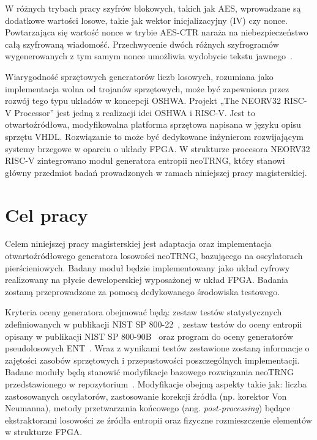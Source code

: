 W różnych trybach pracy szyfrów blokowych, takich jak AES, wprowadzane są 
dodatkowe wartości losowe, takie jak wektor inicjalizacyjny (IV) czy nonce. 
Powtarzająca się wartość nonce w trybie AES-CTR naraża na niebezpieczeństwo 
całą szyfrowaną wiadomość. Przechwycenie dwóch różnych szyfrogramów 
wygenerowanych z tym samym nonce umożliwia wydobycie tekstu jawnego~\cite{NIST-SP-800-38A}.

Wiarygodność sprzętowych generatorów liczb losowych, rozumiana jako 
implementacja wolna od trojanów sprzętowych, może być zapewniona przez rozwój 
tego typu układów w koncepcji OSHWA. Projekt „The NEORV32 RISC-V Processor” 
jest jedną z realizacji idei OSHWA i RISC-V. Jest to otwartoźródłowa, 
modyfikowalna platforma sprzętowa napisana w języku opisu sprzętu VHDL. 
Rozwiązanie to może być dedykowane inżynierom rozwijającym systemy brzegowe 
w oparciu o układy FPGA. W strukturze procesora NEORV32 RISC-V zintegrowano 
moduł generatora entropii neoTRNG, który stanowi główny przedmiot badań 
prowadzonych w ramach niniejszej pracy magisterskiej.

\section{Cel pracy}

\noindent Celem niniejszej pracy magisterskiej jest adaptacja oraz 
implementacja otwartoźródłowego generatora losowości neoTRNG, bazującego na 
oscylatorach pierścieniowych. Badany moduł będzie implementowany jako układ 
cyfrowy realizowany na płycie deweloperskiej wyposażonej w układ FPGA. Badania 
zostaną przeprowadzone za pomocą dedykowanego środowiska testowego. 

Kryteria oceny generatora obejmować będą: zestaw testów statystycznych 
zdefiniowanych w publikacji NIST SP 800-22~\cite{NIST-SP-800-22}, 
zestaw testów do oceny entropii opisany w publikacji 
NIST SP 800-90B~\cite{NIST-SP-800-90B} oraz program do oceny 
generatorów pseudolosowych ENT~\cite{fourmilab-ENT}. Wraz z wynikami testów 
zestawione zostaną informacje o zajętości zasobów sprzętowych 
i przepustowości poszczególnych implementacji. Badane moduły będą 
stanowić modyfikacje bazowego rozwiązania neoTRNG przedstawionego 
w repozytorium~\cite{neoTRNG}. Modyfikacje obejmą aspekty takie jak: 
liczba zastosowanych oscylatorów, zastosowanie korekcji źródła 
(np. korektor Von Neumanna), metody przetwarzania końcowego 
(ang. \textit{post-processing})  będące ekstraktorami 
losowości ze źródła entropii oraz fizyczne 
rozmieszczenie elementów w strukturze FPGA.




